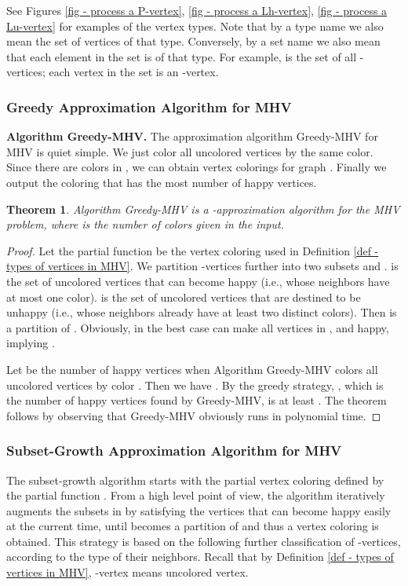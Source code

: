 \documentclass[11pt]{article}
\newtheorem{theorem}{Theorem}[section]
\newcommand{\qed}{\vrule height4pt width4pt depth2pt}
\begin{document}
See Figures \ref{fig - process a P-vertex}, \ref{fig - process a Lh-vertex},
\ref{fig - process a Lu-vertex} for examples of the vertex types.
Note that by a type name we also mean the set of vertices of that type.
Conversely, by a set name we also mean that each element in the set
is of that type. For example,  is the set of all -vertices;
each vertex in the set  is an -vertex.




\subsubsection{Greedy Approximation Algorithm for MHV}
\label{subsec - greedy approxalg for MHV}
{\bf Algorithm {\sc Greedy-MHV}.}
The approximation algorithm {\sc Greedy-MHV} for MHV is quiet simple.
We just color all uncolored vertices by the same color.
Since there are  colors in , we can obtain  vertex colorings for
graph . Finally we output the coloring that has the most number of
happy vertices.

\begin{theorem}
\label{th - 1/k-approximation for MHV}
Algorithm {\sc Greedy-MHV} is a -approximation algorithm for the MHV
problem, where  is the number of colors given in the input.
\end{theorem}
\begin{proof}
Let the partial function  be the vertex coloring used in Definition
\ref{def - types of vertices in MHV}.
We partition -vertices further into two subsets  and .
 is the set of uncolored vertices that can become happy (i.e., whose
neighbors have at most one color).  is the set of uncolored vertices
that are destined to be unhappy (i.e., whose neighbors already have
at least two distinct colors). Then  is a partition of
. Obviously, in the best case  can make all vertices in , 
and  happy, implying .

Let  be the number of happy vertices when Algorithm {\sc Greedy-MHV}
colors all uncolored vertices by color .
Then we have .
By the greedy strategy, , which is the number of happy vertices found
by {\sc Greedy-MHV}, is at least .
The theorem follows by observing that {\sc Greedy-MHV} obviously runs in
polynomial time.
\qed
\end{proof}





\subsubsection{Subset-Growth Approximation Algorithm for MHV}
\label{subsec - subset-growth approxalg for MHV}
The subset-growth algorithm starts with the partial vertex coloring
 defined by the partial function .
From a high level point of view, the algorithm iteratively augments
the subsets in  by satisfying the vertices that
can become happy easily at the current time, until 
becomes a partition of  and thus a vertex coloring is obtained.
This strategy is based on the following further classification of
-vertices, according to the type of their neighbors.
Recall that by Definition \ref{def - types of vertices in MHV},
-vertex means uncolored vertex.
\end{document}
